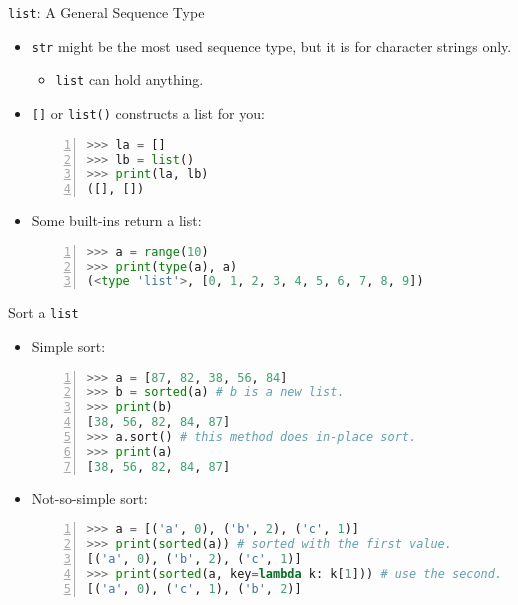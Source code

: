 \documentclass[dvips,xcolor=pst,14pt]{beamer}
\begin{document}
\begin{frame}[fragile]{
%
\texttt{list}: A General Sequence Type
%
}
\begin{itemize}
\item \texttt{str} might be the most used sequence type, but it is for
character strings only.
  \begin{itemize}
  \item \texttt{list} can hold anything.
  \end{itemize}
\item \texttt{[]} or \texttt{list()} constructs a list for you:
  \begin{lstlisting}[basicstyle=\scriptsize\ttfamily,numbers=left,language=Python]
>>> la = []
>>> lb = list()
>>> print(la, lb)
([], [])
  \end{lstlisting}
\item Some built-ins return a list:
  \begin{lstlisting}[basicstyle=\scriptsize\ttfamily,numbers=left,language=Python]
>>> a = range(10)
>>> print(type(a), a)
(<type 'list'>, [0, 1, 2, 3, 4, 5, 6, 7, 8, 9])
  \end{lstlisting}
\end{itemize}
\end{frame}

\begin{frame}[fragile]{
%
Sort a \texttt{list}
%
}
\begin{itemize}
\item Simple sort:
  \begin{lstlisting}[basicstyle=\scriptsize\ttfamily,numbers=left,language=Python]
>>> a = [87, 82, 38, 56, 84]
>>> b = sorted(a) # b is a new list.
>>> print(b)
[38, 56, 82, 84, 87]
>>> a.sort() # this method does in-place sort.
>>> print(a)
[38, 56, 82, 84, 87]
  \end{lstlisting}
\item Not-so-simple sort:
  \begin{lstlisting}[basicstyle=\scriptsize\ttfamily,numbers=left,language=Python]
>>> a = [('a', 0), ('b', 2), ('c', 1)]
>>> print(sorted(a)) # sorted with the first value.
[('a', 0), ('b', 2), ('c', 1)]
>>> print(sorted(a, key=lambda k: k[1])) # use the second.
[('a', 0), ('c', 1), ('b', 2)]
  \end{lstlisting}
\end{itemize}
\end{frame}
\end{document}
